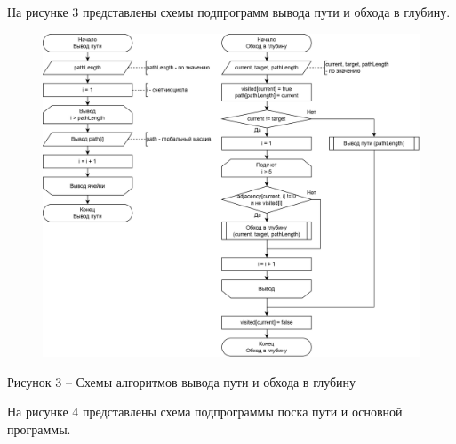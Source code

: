 \documentclass[a4paper,14pt]{extarticle}
\begin{document}
  \pagebreak
  На рисунке 3 представлены схемы подпрограмм вывода пути и обхода в глубину.

  \begin{figure}[h]
    \centering
    \includegraphics[width=1\linewidth]{images/s-2.png}
  \end{figure}
  \begin{center}
    Рисунок 3 – Схемы алгоритмов вывода пути и обхода в глубину
  \end{center}

  \pagebreak
  На рисунке 4 представлены схема подпрограммы поска пути и основной программы.
\end{document}

